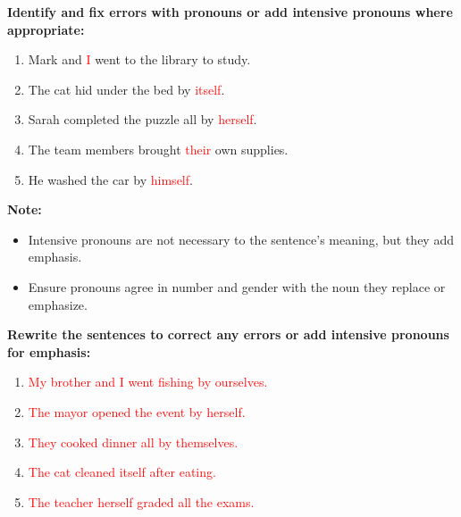 \documentclass[12pt]{article}
\begin{document}
\begin{tcolorbox}[colframe=black!60, colback=white, 
coltitle=black, colbacktitle=black!15, fonttitle=\bfseries\Large, 
title=Guided Practice, halign title=center, left=10pt, right=10pt, top=10pt, bottom=15pt]
\textbf{Identify and fix errors with pronouns or add intensive pronouns where appropriate:}
\begin{enumerate}[itemsep=3em]
    \item Mark and \textcolor{red}{I} went to the library to study.
    \item The cat hid under the bed by \textcolor{red}{itself}.
    \item Sarah completed the puzzle all by \textcolor{red}{herself}.
    \item The team members brought \textcolor{red}{their} own supplies.
    \item He washed the car by \textcolor{red}{himself}.
\end{enumerate}
\end{tcolorbox}

\vspace{1em}

\begin{tcolorbox}[colframe=black!40, colback=gray!5, 
coltitle=black, colbacktitle=black!20, fonttitle=\bfseries\Large, 
title=Additional Notes, halign title=center, left=5pt, right=5pt, top=5pt, bottom=15pt]
\textbf{Note:}
\begin{itemize}
    \item Intensive pronouns are not necessary to the sentence's meaning, but they add emphasis.
    \item Ensure pronouns agree in number and gender with the noun they replace or emphasize.
\end{itemize}
\end{tcolorbox}

\vspace{1em}

\begin{tcolorbox}[colframe=black!60, colback=white, 
coltitle=black, colbacktitle=black!15, fonttitle=\bfseries\Large, 
title=Independent Practice, halign title=center, left=10pt, right=10pt, top=10pt, bottom=15pt]
\textbf{Rewrite the sentences to correct any errors or add intensive pronouns for emphasis:}
\begin{enumerate}[itemsep=3em]
    \item \textcolor{red}{My brother and I went fishing by ourselves.}
    \item \textcolor{red}{The mayor opened the event by herself.}
    \item \textcolor{red}{They cooked dinner all by themselves.}
    \item \textcolor{red}{The cat cleaned itself after eating.}
    \item \textcolor{red}{The teacher herself graded all the exams.}
\end{enumerate}
\end{tcolorbox}
\end{document}
